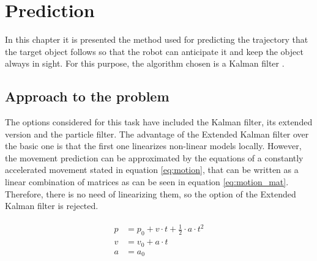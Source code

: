 
\chapter{Prediction} %
\label{chap:prediction}
In this chapter it is presented the method used for predicting the trajectory that the target object follows so that the robot can anticipate it and keep the object always in sight.
For this purpose, the algorithm chosen is a Kalman filter \cite{kalman}.

\section{Approach to the problem}
The options considered for this task have included the Kalman filter, its extended version and the particle filter. The advantage of the Extended Kalman filter over the basic one is that the first one linearizes non-linear models locally. However, the movement prediction can be approximated by the equations of a constantly accelerated movement stated in equation \eqref{eq:motion}, that can be written as a linear combination of matrices as can be seen in equation \eqref{eq:motion_mat}. Therefore, there is no need of linearizing them, so the option of the Extended Kalman filter is rejected.

\begin{align}
\begin{split}
p &= p_{0} + v \cdot t + \frac{1}{2} \cdot a \cdot t^{2} \\
v &= v_{0} + a \cdot t \\
a &= a_{0} \\
\end{split}
\label{eq:motion}
\end{align}


